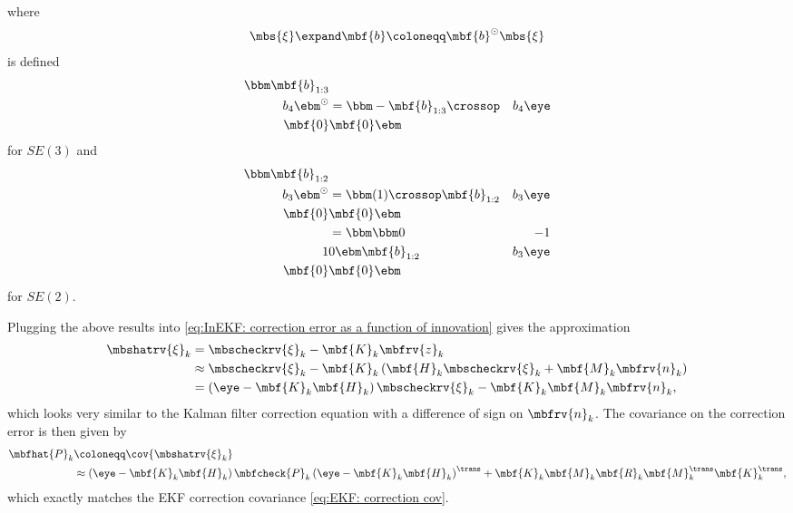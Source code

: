 \documentclass[nobib, nofonts, notoc]{tufte-handout}
\begin{document}
    where 
    \begin{align}
        \mbs{\xi}\expand\mbf{b} \coloneqq \mbf{b}^{\odot}\mbs{\xi}\\
    \end{align}
    is defined 
    \begin{align}
        \bbm
            \mbf{b}_{1:3}\\
            b_{4}
        \ebm^{\odot}
        &=
        \bbm
            -\mbf{b}_{1:3}\crossop & b_{4}\eye \\ \mbf{0} & \mbf{0}
        \ebm
    \end{align}
    for $SE(3)$ and 
    \begin{align}
        \bbm
            \mbf{b}_{1:2}\\
            b_{3}
        \ebm^{\odot}
        &=
        \bbm
            (1)\crossop\mbf{b}_{1:2} & b_{3}\eye \\ \mbf{0} & \mbf{0}
        \ebm\\
        &=
        \bbm
            \bbm 0 & -1\\1 & 0 \ebm\mbf{b}_{1:2} & b_{3}\eye \\ \mbf{0} & \mbf{0}
        \ebm
    \end{align}
    for $SE(2)$.
    
    Plugging the above results into \eqref{eq:InEKF: correction error as a function of innovation} gives the approximation
    \begin{align}
        \mbshatrv{\xi}_{k} &= 
        \mbscheckrv{\xi}_{k} - \mbf{K}_{k}\mbfrv{z}_{k}\\
        &\approx
        \mbscheckrv{\xi}_{k} - \mbf{K}_{k}\left( \mbf{H}_{k}\mbscheckrv{\xi}_{k} + \mbf{M}_{k}\mbfrv{n}_{k} \right)\\
        &= \left( \eye - \mbf{K}_{k}\mbf{H}_{k} \right)\mbscheckrv{\xi}_{k} - \mbf{K}_{k}\mbf{M}_{k}\mbfrv{n}_{k},
    \end{align}
    which looks very similar to the Kalman filter correction equation with a difference of sign on $\mbfrv{n}_{k}$. The covariance on the correction error is then given by
    \begin{align}
        \mbfhat{P}_{k} &\coloneqq \cov{\mbshatrv{\xi}_{k}}\\
        &\approx \left( \eye - \mbf{K}_{k}\mbf{H}_{k} \right)\mbfcheck{P}_{k}\left( \eye - \mbf{K}_{k}\mbf{H}_{k} \right)^{\trans} + \mbf{K}_{k}\mbf{M}_{k}\mbf{R}_{k}\mbf{M}_{k}^{\trans}\mbf{K}_{k}^{\trans},
    \end{align}
    which exactly matches the EKF correction covariance \eqref{eq:EKF: correction cov}.
\end{document}
